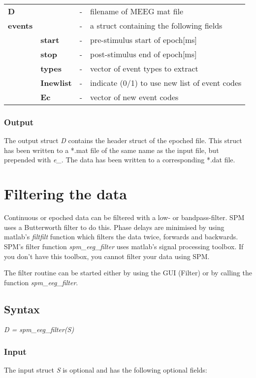 \begin{tabular}{llcp{9cm}}
{\bf D} & &  - & filename of MEEG mat file\\
{\bf events}&  & - & a struct containing the following fields\\
& {\bf start} & - & pre-stimulus start of epoch[ms]\\
& {\bf stop} & - & post-stimulus end of epoch[ms]\\
& {\bf types} & - & vector of event types to extract\\
& {\bf Inewlist} & - & indicate (0/1) to use new list of event codes\\
& {\bf Ec} & - & vector of new event codes
\end{tabular}

\subsubsection{Output}
The output struct {\it D} contains the header struct of the epoched
file. This struct has been written to a *.mat file of the same name as
the input file, but prepended with {\it e\_}. The data has been
written to a corresponding *.dat file.


\section{Filtering the data}
Continuous or epoched data can be filtered with a low- or
bandpass-filter. SPM uses a Butterworth filter to do this. Phase
delays are minimised by using matlab's {\it filtfilt} function which
filters the data twice, forwards and
backwards. SPM's filter function {\it spm\_eeg\_filter} uses matlab's
signal processing toolbox. If you don't have this toolbox, you cannot
filter your data using SPM. 

The filter routine can be started either by using the GUI
(Filter) or by calling the function \textit{spm\_eeg\_filter}.

\subsection{Syntax}
\textit{D = spm\_eeg\_filter(S)}
\\

\subsubsection{Input}
The input struct {\it S} is optional and has the following optional fields:

